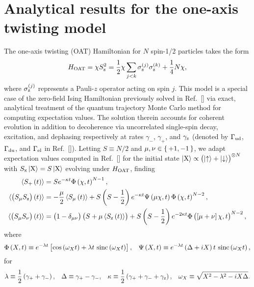 \section{Analytical results for the one-axis twisting model}
\label{sec:OAT}

The one-axis twisting (OAT) Hamiltonian for $N$ spin-1/2 particles
takes the form
\begin{align}
  H_{\text{OAT}}
  = \chi S_{\text{z}}^2
  = \dfrac{1}{2} \chi \sum_{j<k} \sigma_{\text{z}}^{(j)} \sigma_{\text{z}}^{(k)} + \dfrac{1}{4} N \chi,
\end{align}
where $\sigma_{\text{z}}^{(j)}$ represents a Pauli-$z$ operator acting on spin
$j$.  This model is a special case of the zero-field Ising Hamiltonian
previously solved in Ref.~[] via
exact, analytical treatment of the quantum trajectory Monte Carlo
method for computing expectation values.  The solution therein
accounts for coherent evolution in addition to decoherence via
uncorrelated single-spin decay, excitation, and dephasing respectively
at rates $\gamma_-$, $\gamma_+$, and $\gamma_{\text{z}}$ (denoted by
$\Gamma_{\text{ud}}$, $\Gamma_{\text{du}}$, and $\Gamma_{\text{el}}$ in
Ref.~[]).  Letting $S\equiv N/2$
and $\mu,\nu\in\set{+1,-1}$, we adapt expectation values computed in
Ref.~[] for the initial state
$\ket{\text{X}}\propto\left( \ket{\uparrow}+\ket{\downarrow} \right)^{\otimes N}$ with
$S_{\text{x}}\ket{\text{X}}=S\ket{\text{X}}$ evolving under $H_{\text{OAT}}$, finding
\begin{align}
  \braket{S_+\left( t \right)}
  &= S e^{-\kappa t} \Phi\left( \chi,t \right)^{N-1},
  \label{eq:S+_OAT} \\
  \braket{\left( S_\mu S_{\text{z}} \right)\left( t \right)}
  &= -\dfrac{\mu}{2}\braket{S_\mu\left( t \right)}
  + S \left( S-\dfrac{1}{2} \right) e^{-\kappa t}
  \Psi\left( \mu\chi,t \right) \Phi\left( \chi,t \right)^{N-2}, \\
  \braket{\left( S_\mu S_\nu \right)\left( t \right)}
  &= \left( 1-\delta_{\mu\nu} \right) \left( S + \mu\braket{S_{\text{z}}\left( t \right)} \right)
  + S \left( S-\dfrac{1}{2} \right) e^{-2\kappa t} \Phi\left( \left[ \mu+\nu \right]\chi,t \right)^{N-2},
  \label{eq:SS+-_OAT}
\end{align}
where
\begin{align}
  \Phi\left( X,t \right)
  \equiv e^{-\lambda t}
  \left[ \cos\left( \omega_X t \right) + \lambda t~\text{sinc}\left( \omega_X t \right) \right],
  &&
  \Psi\left( X,t \right)
  \equiv e^{-\lambda t}\left( \Delta+iX \right)t~\text{sinc}\left( \omega_X t \right),
\end{align}
for
\begin{align}
  \lambda \equiv \dfrac{1}{2} \left( \gamma_+ + \gamma_- \right),
  &&
  \Delta \equiv \gamma_+ - \gamma_-,
  &&
  \kappa \equiv \dfrac{1}{2} \left( \gamma_+ + \gamma_- + \gamma_{\text{z}} \right),
  &&
  \omega_X \equiv \sqrt{X^2-\lambda^2-iX\Delta}.
\end{align}
